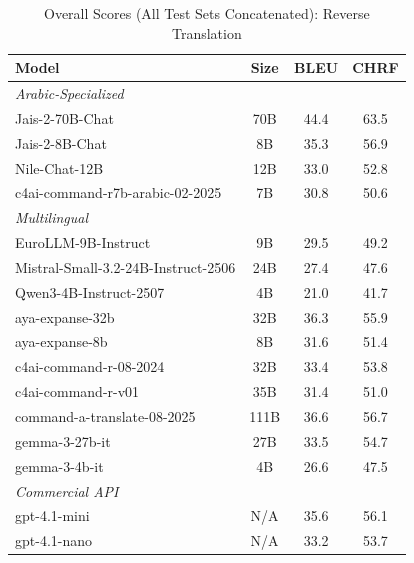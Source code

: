 \begin{table}[htbp]
\centering
\caption{Overall Scores (All Test Sets Concatenated): Reverse Translation}
\label{tab:overall_scores_reverse}
\begin{tabular}{l@{\hspace{3pt}}c@{\hspace{3pt}}c@{\hspace{3pt}}c}
\toprule
Model & Size & BLEU & CHRF \\
\midrule
\multicolumn{4}{l}{\textit{Arabic-Specialized}} \\
\midrule
Jais-2-70B-Chat & 70B & 44.4 & 63.5 \\
Jais-2-8B-Chat & 8B & 35.3 & 56.9 \\
Nile-Chat-12B & 12B & 33.0 & 52.8 \\
c4ai-command-r7b-arabic-02-2025 & 7B & 30.8 & 50.6 \\
\midrule
\multicolumn{4}{l}{\textit{Multilingual}} \\
\midrule
EuroLLM-9B-Instruct & 9B & 29.5 & 49.2 \\
Mistral-Small-3.2-24B-Instruct-2506 & 24B & 27.4 & 47.6 \\
Qwen3-4B-Instruct-2507 & 4B & 21.0 & 41.7 \\
aya-expanse-32b & 32B & 36.3 & 55.9 \\
aya-expanse-8b & 8B & 31.6 & 51.4 \\
c4ai-command-r-08-2024 & 32B & 33.4 & 53.8 \\
c4ai-command-r-v01 & 35B & 31.4 & 51.0 \\
command-a-translate-08-2025 & 111B & 36.6 & 56.7 \\
gemma-3-27b-it & 27B & 33.5 & 54.7 \\
gemma-3-4b-it & 4B & 26.6 & 47.5 \\
\midrule
\multicolumn{4}{l}{\textit{Commercial API}} \\
\midrule
gpt-4.1-mini & N/A & 35.6 & 56.1 \\
gpt-4.1-nano & N/A & 33.2 & 53.7 \\
\midrule
\bottomrule
\end{tabular}
\end{table}